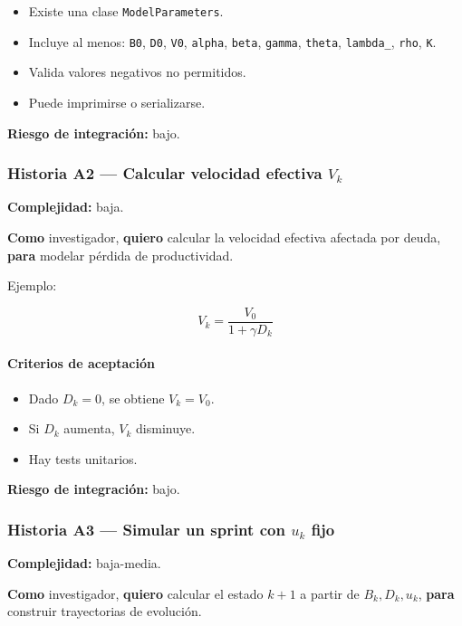 \documentclass[11pt,a4paper]{article}
\begin{document}
\begin{itemize}[leftmargin=*]
    \item Existe una clase \texttt{ModelParameters}.
    \item Incluye al menos: \texttt{B0}, \texttt{D0}, \texttt{V0}, \texttt{alpha}, \texttt{beta}, \texttt{gamma}, \texttt{theta}, \texttt{lambda\_}, \texttt{rho}, \texttt{K}.
    \item Valida valores negativos no permitidos.
    \item Puede imprimirse o serializarse.
\end{itemize}

\textbf{Riesgo de integraci\'on:} bajo.

\subsubsection{Historia A2 --- Calcular velocidad efectiva $V_k$}

\textbf{Complejidad:} baja.

\textbf{Como} investigador, \textbf{quiero} calcular la velocidad efectiva afectada por deuda, \textbf{para} modelar p\'erdida de productividad.

Ejemplo:

\begin{equation}
V_k = \frac{V_0}{1+\gamma D_k}
\end{equation}

\paragraph{Criterios de aceptaci\'on}

\begin{itemize}[leftmargin=*]
    \item Dado $D_k=0$, se obtiene $V_k=V_0$.
    \item Si $D_k$ aumenta, $V_k$ disminuye.
    \item Hay tests unitarios.
\end{itemize}

\textbf{Riesgo de integraci\'on:} bajo.

\subsubsection{Historia A3 --- Simular un sprint con $u_k$ fijo}

\textbf{Complejidad:} baja-media.

\textbf{Como} investigador, \textbf{quiero} calcular el estado $k+1$ a partir de $B_k,D_k,u_k$, \textbf{para} construir trayectorias de evoluci\'on.
\end{document}
